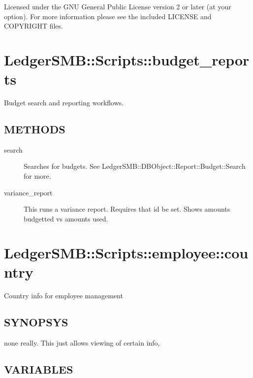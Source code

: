 \begin{description}
Licensed under the GNU General Public License version 2 or later (at your 
option).  For more information please see the included LICENSE and COPYRIGHT 
files.

\section{LedgerSMB::Scripts::budget\_reports\label{LedgerSMB::Scripts::budget_reports}}


Budget search and reporting workflows.

\subsection*{METHODS\label{LedgerSMB::Scripts::budget_reports_METHODS}}
\begin{description}

\item[{search}] \mbox{}

Searches for budgets.  See LedgerSMB::DBObject::Report::Budget::Search for 
more.


\item[{variance\_report}] \mbox{}

This runs a variance report.  Requires that id be set.  Shows amounts budgetted
vs amounts used.

\end{description}
\section{LedgerSMB::Scripts::employee::country\label{LedgerSMB::Scripts::employee::country}}


Country info for employee management

\subsection*{SYNOPSYS\label{LedgerSMB::Scripts::employee::country_SYNOPSYS}}


none really.  This just allows viewing of certain info,

\subsection*{VARIABLES\label{LedgerSMB::Scripts::employee::country_VARIABLES}}
\begin{description}


\end{description}
\end{description}

